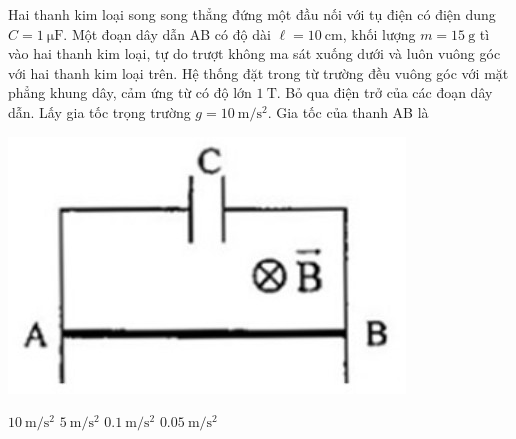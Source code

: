 \begin{ex}
	Hai thanh kim loại song song thẳng đứng một đầu nối với tụ điện có điện dung $C=\SI{1}{\micro\farad}$. Một đoạn dây dẫn AB có độ dài $\ell=\SI{10}{\centi\meter}$, khối lượng $m=\SI{15}{\gram}$ tì vào hai thanh kim loại, tự do trượt không ma sát xuống dưới và luôn vuông góc với hai thanh kim loại trên. Hệ thống đặt trong từ trường đều vuông góc với mặt phẳng khung dây, cảm ứng từ có độ lớn $\SI{1}{\tesla}$. Bỏ qua điện trở của các đoạn dây dẫn. Lấy gia tốc trọng trường $g=\SI{10}{\meter/\second^2}$. Gia tốc của thanh AB là
	\begin{center}
		\includegraphics[width=0.3\linewidth]{figs/VN12-Y24-PH-SYL-022P-7}
	\end{center}
	\choice
	{\True $\SI{10}{\meter/\second^2}$}
	{$\SI{5}{\meter/\second^2}$}
	{$\SI{0.1}{\meter/\second^2}$}
	{$\SI{0.05}{\meter/\second^2}$}
\end{ex}
